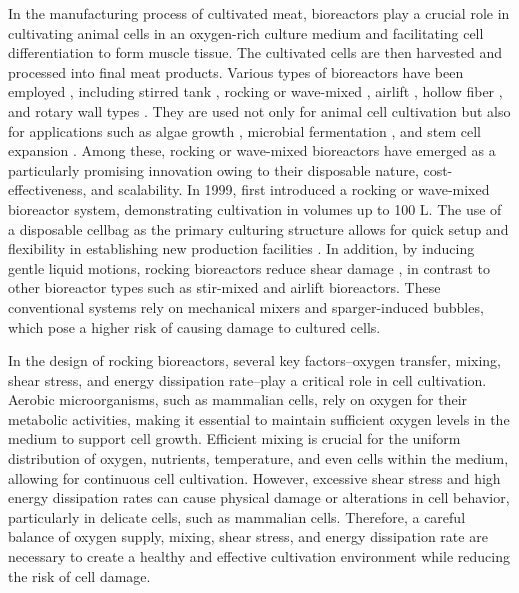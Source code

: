 \documentclass[final,3p,times,twocolumn,authoryear]{elsarticle}
\theoremstyle{definition}
\begin{document}
In the manufacturing process of cultivated meat, bioreactors play a crucial role in cultivating animal cells in an oxygen-rich culture medium and facilitating cell differentiation to form muscle tissue. The cultivated cells are then harvested and processed into final meat products. Various types of bioreactors have been employed \citep{Rivera2022}, including stirred tank \citep{Liu2012,Bach2017,Wodolazski2020,Kahouadji2022}, rocking or wave-mixed \citep{Singh1999,Eibl2010,Junne2013}, airlift \citep{Mashhadani2015,Mutaf2023}, hollow fiber \citep{Mohebbi2012}, and rotary wall types \citep{Cinbiz2010}. They are used not only for animal cell cultivation but also for applications such as algae growth \citep{Duan2014}, microbial fermentation \citep{Gill2008}, and stem cell expansion \citep{King2007}. Among these, rocking or wave-mixed bioreactors have emerged as a particularly promising innovation owing to their disposable nature, cost-effectiveness, and scalability. In 1999, \citet{Singh1999} first introduced a rocking or wave-mixed bioreactor system, demonstrating cultivation in volumes up to 100 L. The use of a disposable cellbag as the primary culturing structure allows for quick setup and flexibility in establishing new production facilities \citep{Eibl2010,Junne2013}. In addition, by inducing gentle liquid motions, rocking bioreactors reduce shear damage \citep{Singh1999,Junne2013}, in contrast to other bioreactor types such as stir-mixed and airlift bioreactors. These conventional systems rely on mechanical mixers and sparger-induced bubbles, which pose a higher risk of causing damage to cultured cells. 

In the design of rocking bioreactors, several key factors--oxygen transfer, mixing, shear stress, and energy dissipation rate--play a critical role in cell cultivation. Aerobic microorganisms, such as mammalian cells, rely on oxygen for their metabolic activities, making it essential to maintain sufficient oxygen levels in the medium to support cell growth. Efficient mixing is crucial for the uniform distribution of oxygen, nutrients, temperature, and even cells within the medium, allowing for continuous cell cultivation. However, excessive shear stress and high energy dissipation rates can cause physical damage or alterations in cell behavior, particularly in delicate cells, such as mammalian cells. Therefore, a careful balance of oxygen supply, mixing, shear stress, and energy dissipation rate are necessary to create a healthy and effective cultivation environment while reducing the risk of cell damage.
\end{document}

